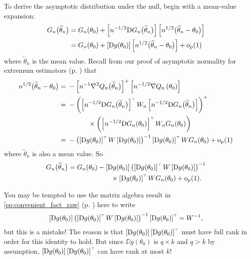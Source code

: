 \documentclass[11pt,letterpaper,reqno,oneside]{article}
\begin{document}
To derive the asymptotic distribution under the null, begin with a mean-value expansion:
%
\begin{align*}
	G_n\bigl( \widehat{\theta}_n \bigr)
	={}& G_n( \theta_0 )
	+ \left[ n^{-1/2} \mathrm{D} G_n\bigl( \widetilde{\theta}_n \bigr) \right]
	\left[ n^{1/2} \bigl( \widehat{\theta}_n - \theta_0 \bigr) \right]
	\\
	={}& G_n( \theta_0 )
	+ \left[ \mathrm{D} g( \theta_0 ) \right] 
	\left[ n^{1/2} \bigl( \widehat{\theta}_n - \theta_0 \bigr) \right]
	+ \mathrm{o}_{\mathrm{p}}(1)
\end{align*}
%
where $\widetilde{\theta}_n$ is the mean value. Recall from our proof of asymptotic normality for extremum estimators (p. \pageref{proposition:asymptotic_normality}) that
%
\begin{align*}
	n^{1/2} \bigl( \widehat{\theta}_n - \theta_0 \bigr)
	={}& - \left[ n^{-1} \nabla^2 Q_n\bigl( \widetilde{\theta}_n \bigr) \right]^+
	\left[ n^{-1/2} \nabla Q_n\left( \theta_0 \right) \right] 
	\\
	={}& - \left( \left[ n^{-1/2} \mathrm{D} G_n\bigl( \widetilde{\theta}_n \bigr) \right]^{\scriptscriptstyle \top} 
	W_n \left[ n^{-1/2} \mathrm{D} G_n\bigl( \widetilde{\theta}_n \bigr) \right] \right)^+
	\\
	&\quad\quad\quad\times
	\left( \left[ n^{-1/2} \mathrm{D} G_n(\theta_0) \right]^{\scriptscriptstyle \top} W_n G_n(\theta_0) \right)
	\\
	={}& - \left( \left[ \mathrm{D} g(\theta_0) \right]^{\scriptscriptstyle \top} 
	W \left[ \mathrm{D} g(\theta_0) \right] \right)^{-1}
	\left[ \mathrm{D} g(\theta_0) \right]^{\scriptscriptstyle \top} W G_n(\theta_0)
	+ \mathrm{o}_{\mathrm{p}}(1)
\end{align*}
%
where $\widetilde{\theta}_n$ is also a mean value. So
%
\begin{align*}
	G_n\bigl( \widehat{\theta}_n \bigr)
	={}& G_n( \theta_0 )
	- \left[ \mathrm{D} g( \theta_0 ) \right] 
	\left( \left[ \mathrm{D} g(\theta_0) \right]^{\scriptscriptstyle \top} 
	W \left[ \mathrm{D} g(\theta_0) \right] \right)^{-1}
	\\
	&\quad\quad\quad\quad\quad\times
	\left[ \mathrm{D} g(\theta_0) \right]^{\scriptscriptstyle \top} W G_n(\theta_0)
	+ \mathrm{o}_{\mathrm{p}}(1) .
\end{align*}


You may be tempted to use the matrix algebra result in \cref{eq:convenient_fact_raw} (p. \pageref{eq:convenient_fact_raw}) here to write
%
\begin{equation*}
	\left[ \mathrm{D} g( \theta_0 ) \right] 
	\left( \left[ \mathrm{D} g(\theta_0) \right]^{\scriptscriptstyle \top} 
	W \left[ \mathrm{D} g(\theta_0) \right] \right)^{-1}
	\left[ \mathrm{D} g(\theta_0) \right]^{\scriptscriptstyle \top}
	= W^{-1} ,
\end{equation*}
%
but this is a mistake! The reason is that $\left[ \mathrm{D} g( \theta_0 ) \right] \left[ \mathrm{D} g( \theta_0 ) \right]^{\scriptscriptstyle \top}$ must have full rank in order for this identity to hold. But since $\DD g( \theta_0 )$ is $q \times k$ and $q > k$ by assumption, $\left[ \mathrm{D} g( \theta_0 ) \right] \left[ \mathrm{D} g( \theta_0 ) \right]^{\scriptscriptstyle \top}$ can have rank at most $k$!
\end{document}
